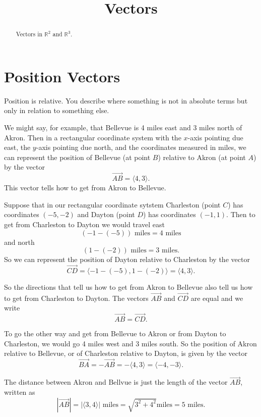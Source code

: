 \documentclass{ximera}
\title{Vectors}
\begin{document}
\begin{abstract}
Vectors in $\mathbb{R}^2$ and  $\mathbb{R}^3$.
\end{abstract}
\maketitle

\section{Position Vectors}

Position is relative. You describe where something is not in absolute terms but only in relation to something else.

We might say, for example, that Bellevue is 4 miles east and 3 miles north of Akron. Then in a rectangular coordinate system with the $x$-axis pointing due east, the $y$-axis pointing due north, and the coordinates measured in miles, we can represent the position of Bellevue (at point $B$) relative to Akron (at point $A$) by the vector
\[
   \overrightarrow{AB} = \langle 4, 3 \rangle .
\]
This vector tells how to get from Akron to Bellevue. 


Suppose that in our rectangular coordinate sytstem Charleston (point $C$) has coordinates $(-5,-2)$ and Dayton (point $D$) has coordinates $(-1,1)$. Then to get from Charleston to Dayton we would travel east
\[
     ( -1 - (-5) ) \text{ miles} = 4 \text{ miles}
\]
and north
\[
     ( 1 - (-2)) \text{ miles} = 3\text{ miles} .
\]
So we can represent the position of Dayton relative to Charleston by the vector
\[
  \overrightarrow{CD} =       \langle -1 - (-5) , 1- (-2)  \rangle   =  \langle 4, 3 \rangle .
\] 

So the directions that tell us how to get from Akron to Bellevue also tell us how to get from Charleston to Dayton. The
vectors $\overrightarrow{AB}$ and $\overrightarrow{CD}$ are equal and we write 
\[
      \overrightarrow{AB} = \overrightarrow{CD} .
\]

To go the other way and get from Bellevue to Akron or from Dayton to Charleston, we would go 4 miles west and 3 miles south. So the  position of Akron relative to Bellevue, or of Charleston relative to Dayton, is given by the vector
\[ 
   \overrightarrow{BA} = - \overrightarrow{AB} = - \langle 4,3 \rangle =  \langle -4,-3 \rangle.
\]

The distance between Akron and Bellvue is just the length of the vector $\overrightarrow{AB}$, written as
\[
    | \overrightarrow{AB}  | =  | \langle 3, 4 \rangle  | \text{ miles} = \sqrt{3^2 + 4^2} \text{miles} = 5 \text{ miles} .
\] 
\end{document}
